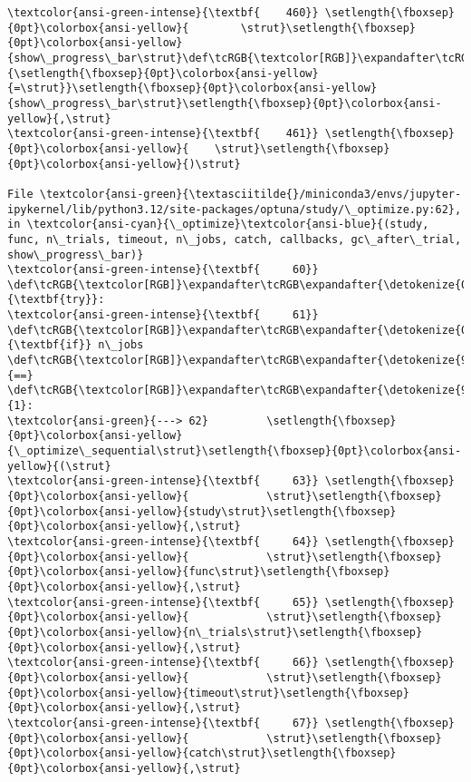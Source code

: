 \documentclass[11pt]{article}
\begin{document}
\begin{Verbatim}[commandchars=\\\{\}, frame=single, framerule=2mm, rulecolor=\color{outerrorbackground}]
\textcolor{ansi-green-intense}{\textbf{    460}} \setlength{\fboxsep}{0pt}\colorbox{ansi-yellow}{        \strut}\setlength{\fboxsep}{0pt}\colorbox{ansi-yellow}{show\_progress\_bar\strut}\def\tcRGB{\textcolor[RGB]}\expandafter\tcRGB\expandafter{\detokenize{98,98,98}}{\setlength{\fboxsep}{0pt}\colorbox{ansi-yellow}{=\strut}}\setlength{\fboxsep}{0pt}\colorbox{ansi-yellow}{show\_progress\_bar\strut}\setlength{\fboxsep}{0pt}\colorbox{ansi-yellow}{,\strut}
\textcolor{ansi-green-intense}{\textbf{    461}} \setlength{\fboxsep}{0pt}\colorbox{ansi-yellow}{    \strut}\setlength{\fboxsep}{0pt}\colorbox{ansi-yellow}{)\strut}

File \textcolor{ansi-green}{\textasciitilde{}/miniconda3/envs/jupyter-ipykernel/lib/python3.12/site-packages/optuna/study/\_optimize.py:62}, in \textcolor{ansi-cyan}{\_optimize}\textcolor{ansi-blue}{(study, func, n\_trials, timeout, n\_jobs, catch, callbacks, gc\_after\_trial, show\_progress\_bar)}
\textcolor{ansi-green-intense}{\textbf{     60}} \def\tcRGB{\textcolor[RGB]}\expandafter\tcRGB\expandafter{\detokenize{0,135,0}}{\textbf{try}}:
\textcolor{ansi-green-intense}{\textbf{     61}}     \def\tcRGB{\textcolor[RGB]}\expandafter\tcRGB\expandafter{\detokenize{0,135,0}}{\textbf{if}} n\_jobs \def\tcRGB{\textcolor[RGB]}\expandafter\tcRGB\expandafter{\detokenize{98,98,98}}{==} \def\tcRGB{\textcolor[RGB]}\expandafter\tcRGB\expandafter{\detokenize{98,98,98}}{1}:
\textcolor{ansi-green}{---> 62}         \setlength{\fboxsep}{0pt}\colorbox{ansi-yellow}{\_optimize\_sequential\strut}\setlength{\fboxsep}{0pt}\colorbox{ansi-yellow}{(\strut}
\textcolor{ansi-green-intense}{\textbf{     63}} \setlength{\fboxsep}{0pt}\colorbox{ansi-yellow}{            \strut}\setlength{\fboxsep}{0pt}\colorbox{ansi-yellow}{study\strut}\setlength{\fboxsep}{0pt}\colorbox{ansi-yellow}{,\strut}
\textcolor{ansi-green-intense}{\textbf{     64}} \setlength{\fboxsep}{0pt}\colorbox{ansi-yellow}{            \strut}\setlength{\fboxsep}{0pt}\colorbox{ansi-yellow}{func\strut}\setlength{\fboxsep}{0pt}\colorbox{ansi-yellow}{,\strut}
\textcolor{ansi-green-intense}{\textbf{     65}} \setlength{\fboxsep}{0pt}\colorbox{ansi-yellow}{            \strut}\setlength{\fboxsep}{0pt}\colorbox{ansi-yellow}{n\_trials\strut}\setlength{\fboxsep}{0pt}\colorbox{ansi-yellow}{,\strut}
\textcolor{ansi-green-intense}{\textbf{     66}} \setlength{\fboxsep}{0pt}\colorbox{ansi-yellow}{            \strut}\setlength{\fboxsep}{0pt}\colorbox{ansi-yellow}{timeout\strut}\setlength{\fboxsep}{0pt}\colorbox{ansi-yellow}{,\strut}
\textcolor{ansi-green-intense}{\textbf{     67}} \setlength{\fboxsep}{0pt}\colorbox{ansi-yellow}{            \strut}\setlength{\fboxsep}{0pt}\colorbox{ansi-yellow}{catch\strut}\setlength{\fboxsep}{0pt}\colorbox{ansi-yellow}{,\strut}

\end{Verbatim}
\end{document}
